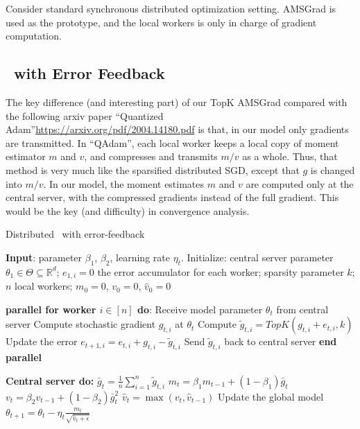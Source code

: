 \documentclass[11pt]{article}
\begin{document}
Consider standard synchronous distributed optimization setting. AMSGrad is used as the prototype, and the local workers is only in charge of gradient computation.


\subsection{\algo\ with Error Feedback}




The key difference (and interesting part) of our TopK AMSGrad compared with the following arxiv paper ``Quantized Adam''\url{https://arxiv.org/pdf/2004.14180.pdf} is that, in our model only gradients are transmitted. In ``QAdam'', each local worker keeps a local copy of moment estimator $m$ and $v$, and compresses and transmits $m/v$ as a whole. Thus, that method is very much like the sparsified distributed SGD, except that $g$ is changed into $m/v$. In our model, the moment estimates $m$ and $v$ are computed only at the central server, with the compressed gradients instead of the full gradient. This would be the key (and difficulty) in convergence analysis.


\begin{algorithm}[H]
\caption{Distributed \algo\ with error-feedback} \label{alg:sparsams}
\begin{algorithmic}[1]

\STATE \textbf{Input}: parameter $\beta_1$, $\beta_2$, learning rate $\eta_t$. 
\STATE Initialize: central server parameter $\theta_{1} \in \Theta \subseteq \mathbb R^d$; $e_{1,i}=0$ the error accumulator for each worker; sparsity parameter $k$; $n$ local workers; $m_0=0$, $v_0=0$, $\hat v_0=0$


\STATE\textbf{parallel for worker $i \in [n]$ do}:
\STATE\quad  Receive model parameter $\theta_{t}$ from central server
\STATE\quad  Compute stochastic gradient $g_{t,i}$ at $\theta_t$
\STATE\quad  Compute $\tilde g_{t,i}=TopK(g_{t,i}+e_{t,i},k)$ \label{line:topk} 
\STATE\quad  Update the error $e_{t+1,i}=e_{t,i}+g_{t,i}-\tilde g_{t,i}$
\STATE\quad  Send $\tilde g_{t,i}$ back to central server
\STATE \textbf{end parallel}

\STATE \textbf{Central server do:}
\STATE $\bar g_{t}=\frac{1}{n}\sum_{i=1}^n \tilde g_{t,i}$
\STATE $m_t=\beta_1 m_{t-1}+(1-\beta_1)\bar g_t$
\STATE $v_t=\beta_2 v_{t-1}+(1-\beta_2)\bar g_t^2$
\STATE $\hat v_t=\max(v_t,\hat v_{t-1})$ \label{line:v}
\STATE Update the global model $\theta_{t+1}=\theta_{t}-\eta_t\frac{m_t}{\sqrt{\hat v_t+\epsilon}}$

\ENDFOR
\end{algorithmic}
\end{algorithm}
\end{document}
